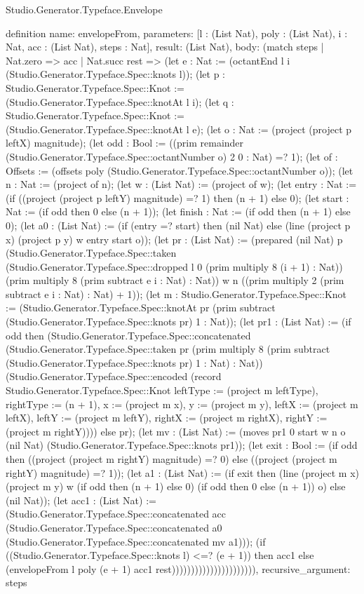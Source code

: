 \begin{lexlean}{Studio.Generator.Typeface.Envelope}
\begin{semanticmodule}
definition{
  name: envelopeFrom,
  parameters: [l : (List Nat), poly : (List Nat), i : Nat, acc : (List Nat), steps : Nat],
  result: (List Nat),
  body: (match steps
    | Nat.zero => acc
    | Nat.succ rest => (let e : Nat := (octantEnd l i (Studio.Generator.Typeface.Spec::knots l)); (let p : Studio.Generator.Typeface.Spec::Knot := (Studio.Generator.Typeface.Spec::knotAt l i); (let q : Studio.Generator.Typeface.Spec::Knot := (Studio.Generator.Typeface.Spec::knotAt l e); (let o : Nat := (project (project p leftX) magnitude); (let odd : Bool := ((prim remainder (Studio.Generator.Typeface.Spec::octantNumber o) 2 0 : Nat) =? 1); (let of : Offsets := (offsets poly (Studio.Generator.Typeface.Spec::octantNumber o)); (let n : Nat := (project of n); (let w : (List Nat) := (project of w); (let entry : Nat := (if ((project (project p leftY) magnitude) =? 1) then (n + 1) else 0); (let start : Nat := (if odd then 0 else (n + 1)); (let finish : Nat := (if odd then (n + 1) else 0); (let a0 : (List Nat) := (if (entry =? start) then (nil Nat) else (line (project p x) (project p y) w entry start o)); (let pr : (List Nat) := (prepared (nil Nat) p (Studio.Generator.Typeface.Spec::taken (Studio.Generator.Typeface.Spec::dropped l 0 (prim multiply 8 (i + 1) : Nat)) (prim multiply 8 (prim subtract e i : Nat) : Nat)) w n ((prim multiply 2 (prim subtract e i : Nat) : Nat) + 1)); (let m : Studio.Generator.Typeface.Spec::Knot := (Studio.Generator.Typeface.Spec::knotAt pr (prim subtract (Studio.Generator.Typeface.Spec::knots pr) 1 : Nat)); (let pr1 : (List Nat) := (if odd then (Studio.Generator.Typeface.Spec::concatenated (Studio.Generator.Typeface.Spec::taken pr (prim multiply 8 (prim subtract (Studio.Generator.Typeface.Spec::knots pr) 1 : Nat) : Nat)) (Studio.Generator.Typeface.Spec::encoded (record Studio.Generator.Typeface.Spec::Knot {leftType := (project m leftType), rightType := (n + 1), x := (project m x), y := (project m y), leftX := (project m leftX), leftY := (project m leftY), rightX := (project m rightX), rightY := (project m rightY)}))) else pr); (let mv : (List Nat) := (moves pr1 0 start w n o (nil Nat) (Studio.Generator.Typeface.Spec::knots pr1)); (let exit : Bool := (if odd then ((project (project m rightY) magnitude) =? 0) else ((project (project m rightY) magnitude) =? 1)); (let a1 : (List Nat) := (if exit then (line (project m x) (project m y) w (if odd then (n + 1) else 0) (if odd then 0 else (n + 1)) o) else (nil Nat)); (let acc1 : (List Nat) := (Studio.Generator.Typeface.Spec::concatenated acc (Studio.Generator.Typeface.Spec::concatenated a0 (Studio.Generator.Typeface.Spec::concatenated mv a1))); (if ((Studio.Generator.Typeface.Spec::knots l) <=? (e + 1)) then acc1 else (envelopeFrom l poly (e + 1) acc1 rest)))))))))))))))))))))),
  recursive_argument: steps
}


\end{semanticmodule}
\end{lexlean}
